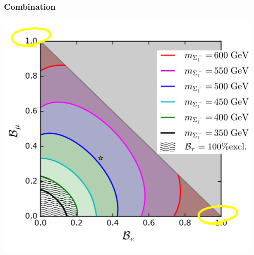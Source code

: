 \documentclass[%
xcolor=dvipsnames,table%
]{beamer}
\begin{document}
\begin{frame}
  \frametitle{Combination}
  \includegraphics[scale=0.54]{clcomb}
\end{frame}
\end{document}
